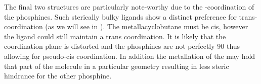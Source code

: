 
The final two structures are particularly note-worthy due to the \cis-coordination of the phosphines.  Such sterically bulky ligands show a distinct preference for trans-coordination (as we will see in ).  The metallacyclobutane must be cis, however the ligand could still maintain a trans coordination.  It is likely that the coordination plane is distorted and the phosphines are not perfectly 90\degrees{} thus allowing for pseudo-cis coordination.  In addition the metallation of the \tBu{} may hold that part of the molecule in a particular geometry resulting in less steric hindrance for the other phosphine.  

